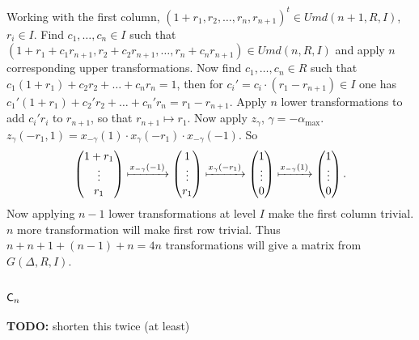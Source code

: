 Working with the first column, $(1+r_1,r_2,\ldots,r_n,r_{n+1})^t\in Umd(n+1,R,I)$, $r_i\in I$. Find $c_1,\ldots,c_n\in I$ such that $(1+r_1+c_1r_{n+1},r_2+c_2r_{n+1},\ldots,r_n+c_nr_{n+1})\in Umd(n,R,I)$ and apply $n$ corresponding upper transformations.
Now find $c_1,\ldots,c_n\in R$ such that $c_1(1+r_1)+c_2r_2+\ldots+c_nr_n=1$, then for $c_i'=c_i\cdot(r_1-r_{n+1})\in I$ one has $c_1'(1+r_1)+c_2'r_2+\ldots+c_n'r_n=r_1-r_{n+1}$. Apply $n$ lower transformations to add $c_i'r_i$ to $r_{n+1}$, so that $r_{n+1}\mapsto r_1$. Now apply $z_\gamma$, $\gamma=-\alpha_\mathrm{max}$. $z_\gamma(-r_1,1)=x_{-\gamma}(1)\cdot x_\gamma(-r_1)\cdot x_{-\gamma}(-1)$. So
\[
\begin{pmatrix}
1+r_1 \\ \vdots \\ r_1
\end{pmatrix}
\xmapsto{x_{-\gamma}(-1)}
\begin{pmatrix}
1\\ \vdots \\ r_1
\end{pmatrix}
\xmapsto{x_\gamma(-r_1)}
\begin{pmatrix}
1\\ \vdots \\ 0
\end{pmatrix}
\xmapsto{x_{-\gamma}(1)}
\begin{pmatrix}
1\\ \vdots \\ 0
\end{pmatrix}.
\]
Now applying $n-1$ lower transformations at level $I$ make the first column trivial. $n$ more transformation will make first row trivial. Thus $n+n+1+(n-1)+n=4n$ transformations will give a matrix from $G(\Delta,R,I)$.

\subsection{$\mathsf{C}_n$}

\textbf{TODO:} shorten this twice (at least)

